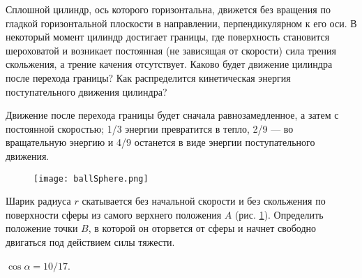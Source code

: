 \begin{ex} %
Сплошной цилиндр, ось которого горизонтальна, движется без вращения по гладкой горизонтальной плоскости в направлении, перпендикулярном к его оси. В некоторый момент цилиндр достигает границы, где поверхность становится шероховатой и возникает постоянная (не зависящая от скорости) сила трения скольжения, а трение качения отсутствует. Каково будет движение цилиндра после перехода границы? Как распределится кинетическая энергия поступательного движения цилиндра?
\begin{ans}
Движение после перехода границы будет сначала равнозамедленное, а затем с постоянной скоростью; 1/3 энергии превратится в тепло, 2/9 — во вращательную энергию и 4/9 останется в виде энергии поступательного движения.
\end{ans}
\end{ex}	

\begin{ex} %

\begin{figure}[h]
\centering
\texttt{[image: ballSphere.png]}
\caption{}
\label{ballSphere}
\end{figure}

Шарик радиуса $r$ скатывается без начальной скорости и без скольжения по поверхности сферы из самого верхнего положения $A$ (рис. \ref{ballSphere}). Определить положение точки $B$, в которой он оторвется от сферы и начнет свободно двигаться под действием силы тяжести.
\begin{ans}
$\cos \alpha = 10/17$.
\end{ans}
\end{ex}	

\clearpage